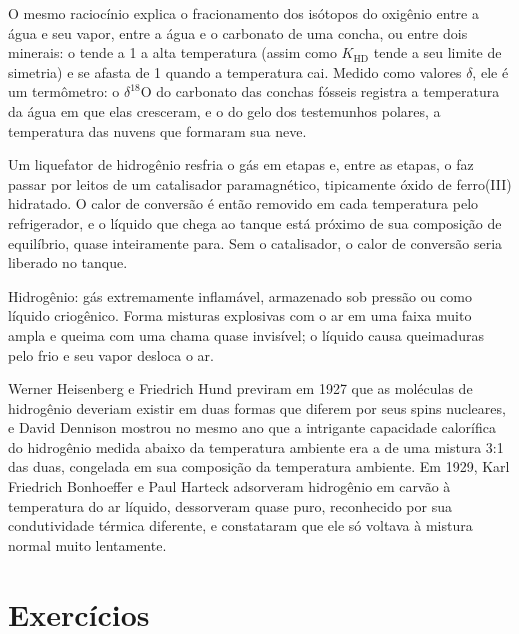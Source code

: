 O mesmo raciocínio explica o fracionamento dos isótopos do oxigênio entre a
água e seu vapor, entre a água e o carbonato de uma concha, ou entre dois
minerais: o  tende a 1 a alta temperatura (assim como
$K_{\mathrm{HD}}$ tende a seu limite de simetria) e se afasta de 1 quando a temperatura
cai. Medido como valores $\delta$, ele é um termômetro: o $\delta^{18}$O do carbonato
das conchas fósseis registra a temperatura da água em que elas cresceram, e o do
gelo dos testemunhos polares, a temperatura das nuvens que formaram sua neve.

\begin{inthelab}
Um liquefator de hidrogênio resfria o gás em etapas e, entre as etapas, o faz
passar por leitos de um catalisador paramagnético, tipicamente óxido de
ferro(III) hidratado. O calor de conversão é então removido em cada temperatura
pelo refrigerador, e o líquido que chega ao tanque está próximo de sua composição
de equilíbrio, quase inteiramente para. Sem o catalisador, o calor de conversão
seria liberado no tanque.
\end{inthelab}

\begin{safety}{}
Hidrogênio: gás extremamente inflamável, armazenado sob pressão ou como líquido
criogênico. Forma misturas explosivas com o ar em uma faixa muito ampla e queima
com uma chama quase invisível; o líquido causa queimaduras pelo frio e seu
vapor desloca o ar.
\end{safety}

\begin{history}
Werner Heisenberg e Friedrich Hund previram em 1927 que as moléculas de
hidrogênio deveriam existir em duas formas que diferem por seus spins nucleares,
e David Dennison mostrou no mesmo ano que a intrigante capacidade calorífica do
hidrogênio medida abaixo da temperatura ambiente era a de uma mistura 3:1 das
duas, congelada em sua composição da temperatura ambiente. Em 1929, Karl
Friedrich Bonhoeffer e Paul Harteck adsorveram hidrogênio em carvão à temperatura
do ar líquido, dessorveram  quase puro, reconhecido por sua
condutividade térmica diferente, e constataram que ele só voltava à mistura
normal muito lentamente.
\end{history}

\section{Exercícios}

